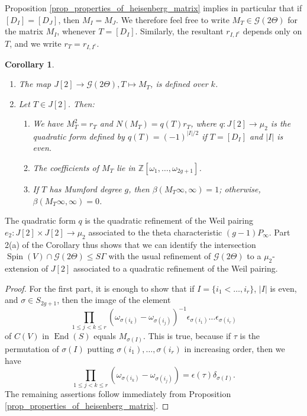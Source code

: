 \documentclass{article} %
\newtheorem{corollary}[proposition]{Corollary}
\numberwithin{equation}{section}
\DeclareMathOperator{\Spin}{Spin}
\DeclareMathOperator{\End}{End}
\newcommand{\Z}{\mathbb{Z}}
\begin{document}
Proposition \ref{prop_properties_of_heisenberg_matrix} implies in particular that if $[D_I] = [D_J]$, then $M_I = M_J$. We therefore feel free to write $M_T \in \mathcal{G}(2 \Theta)$ for the matrix $M_I$, whenever $T = [D_I]$. Similarly, the resultant $r_{I, I^c}$ depends only on $T$, and we write $r_T = r_{I, I^c}$.
\begin{corollary}\label{cor_properties_of_T_Heisenberg_matrices}
    \begin{enumerate}
        \item  The map $J[2] \to \mathcal{G}(2 \Theta), T \mapsto M_T$, is defined over $k$.
        \item Let $T \in J[2]$. Then:
        \begin{enumerate} \item We have $M_T^2 = r_T$ and $N(M_T) = q(T) r_T$, where $q : J[2] \to \mu_2$ is the quadratic form defined by $q(T) = (-1)^{|I| / 2}$ if $T = [D_I]$ and $|I|$ is even.
        \item The coefficients of $M_T$ lie in $\Z[\omega_1, \dots, \omega_{2g+1}]$.
        \item If $T$ has Mumford degree $g$, then $\beta(M_T \infty, \infty) = 1$; otherwise, $\beta(M_T \infty, \infty) = 0$.
        \end{enumerate}
    \end{enumerate}
\end{corollary}
The quadratic form $q$ is the quadratic refinement of the Weil pairing $e_2 : J[2] \times J[2] \to \mu_2$ associated to the theta characteristic $(g-1) P_\infty$. Part 2(a) of the Corollary thus shows that we can identify the intersection $\Spin(V)\cap \mathcal{G}(2 \Theta) \leq S \Gamma$ with the usual refinement of $\mathcal{G}(2 \Theta)$ to a $\mu_2$-extension of $J[2]$ associated to a quadratic refinement of the Weil pairing.
\begin{proof}
    For the first part, it is enough to show that if $I = \{ i_1 < \dots , i_r\} $, $|I|$ is even, and $\sigma \in S_{2g+1}$, then the image of the element
    \[  \prod_{1 \leq j < k \leq r} (\omega_{\sigma(i_k)} - \omega_{\sigma(i_j)})^{-1}  \epsilon_{\sigma(i_1)} \dots \epsilon_{\sigma(i_r)} \]
    of $C(V)$ in $\End(S)$ equals $M_{\sigma(I)}$. This is true, because if $\tau$ is the permutation of $\sigma(I)$ putting $\sigma(i_1), \dots, \sigma(i_r)$ in increasing order, then we have
    \[  \prod_{1 \leq j < k \leq r} (\omega_{\sigma(i_k)} - \omega_{\sigma(i_j)}) = \epsilon(\tau) \delta_{\sigma(I)}. \]
    The remaining assertions follow immediately from Proposition \ref{prop_properties_of_heisenberg_matrix}. 
\end{proof}
\end{document}
